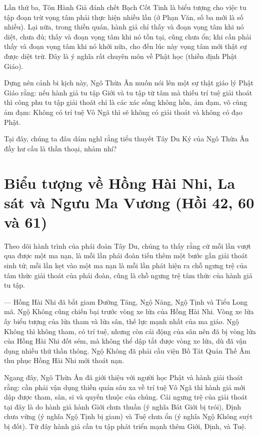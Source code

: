 Lần thứ ba, Tôn Hành Giả đánh chết Bạch Cốt Tinh là biểu tượng cho việc tu tập đoạn trừ vọng tâm phải thực hiện nhiều lần (ở Phạn Văn, số ba mới là số nhiều). Lại nữa, trong thiền quán, hành giả chỉ thấy và đoạn vọng tâm khi nó diệt, chưa đủ; thấy và đoạn vọng tâm khi nó tồn tại, cũng chưa ổn; khi cần phải thấy và đoạn vọng tâm khi nó khởi nữa, cho đến lúc này vọng tâm mới thật sự được diệt trừ. Đây là ý nghĩa rất chuyên môn về Phật học (thiền định Phật Giáo).

Dựng nên cảnh bi kịch này, Ngô Thừa Ân muốn nói lên một sự thật giáo lý Phật Giáo rằng: nếu hành giả tu tập Giới và tu tập từ tâm mà thiếu trí tuệ giải thoát thì công phu tu tập giải thoát chỉ là các xác sống không hồn, ảm đạm, vô cùng ảm đạm: Không có trí tuệ Vô Ngã thì sẽ không có giải thoát và không có đạo Phật.

Tại đây, chúng ta đâu dám nghĩ rằng tiểu thuyết Tây Du Ký của Ngô Thừa Ân đầy hư cấu là thần thoại, nhảm nhí?


\section{Biểu tượng về Hồng Hài Nhi, La sát và Ngưu Ma Vương (Hồi 42, 60 và 61)} %
\label{sec:bieu_tuong_ve_hong_hai_nhi_va_nguu_ma_vuong}

Theo dõi hành trình của phái đoàn Tây Du, chúng ta thấy rằng cứ mỗi lần vượt qua được một ma nạn, là mỗi lần phái đoàn tiến thêm một bước gần giải thoát sinh tử; mỗi lần kẹt vào một ma nạn là mỗi lần phát hiện ra chỗ ngưng trệ của tâm thức giải thoát của phái đoàn, cũng là chỗ ngưng trệ tâm thức của hành giả tu tập.

— Hồng Hài Nhi đã bắt giam Đường Tăng, Ngộ Năng, Ngộ Tịnh và Tiểu Long mã. Ngộ Không cũng chiến bại trước vòng xe lửa của Hồng Hài Nhi. Vòng xe lửa ấy biểu tượng của lửa tham và lửa sân, thế lực mạnh nhất của ma giáo. Ngộ Không thì không tham, có trí tuệ, nhưng còn cái động của sân nên đã bị vòng lửa của Hồng Hài Nhi đốt sém, mà không thể dập tắt được vòng xe lửa, dù đã vận dụng nhiều thứ thần thông. Ngộ Không đã phải cầu viện Bồ Tát Quán Thế Âm thu phục Hồng Hài Nhi mới thoát nạn.

Ngang đây, Ngô Thừa Ân đã giới thiệu với người học Phật và hành giải thoát rằng: cần phải vận dụng thiền quán sâu xa về trí tuệ Vô Ngã thì hành giả mới dập được tham, sân, si và quyến thuộc của chúng. Cái ngưng trệ của giải thoát tại đây là do hành giả hành Giới chưa thuần (ý nghĩa Bát Giới bị trói), Định chưa vững (ý nghĩa Ngộ Tịnh bị giam) và Tuệ chưa ổn (ý nghĩa Ngộ Không suýt bị đốt). Từ đây hành giả cần tu tập phát triển mạnh thêm Giới, Định, và Tuệ.

